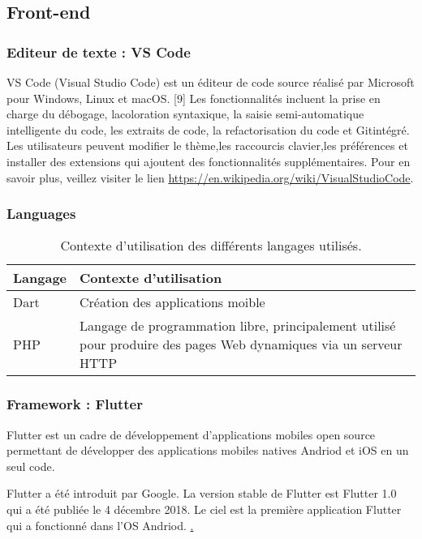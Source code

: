 \documentclass[a4paper, 12pt]{report}
\begin{document}
\subsection{Front-end}
\subsubsection{Editeur de texte : VS Code}
VS Code (Visual Studio Code) est un éditeur de code source réalisé par Microsoft pour Windows, Linux et macOS. [9] Les fonctionnalités incluent la prise en charge du débogage, lacoloration syntaxique, la saisie semi-automatique intelligente du code, les extraits de code, la refactorisation du code et Gitintégré. Les utilisateurs peuvent modifier le thème,les raccourcis clavier,les préférences et installer des extensions qui ajoutent des fonctionnalités supplémentaires. Pour en savoir plus, veillez visiter le lien \href{https://en.wikipedia.org/wiki/Visual_Studio_Code}{https://en.wikipedia.org/wiki/VisualStudioCode}.
\subsubsection{Languages}
\begin{table}[h]
	\begin{tabular}{|m{6cm}|m{10cm}|}
		\hline
		\textbf{Langage} & \textbf{Contexte d’utilisation} \\
		\hline
		Dart & Création des applications moible\\
		\hline
		PHP  & Langage de programmation libre, principalement utilisé pour produire des pages Web dynamiques via un serveur HTTP\\
		\hline
		
	\end{tabular}
	\caption{Contexte d’utilisation des différents langages utilisés.}
\end{table}
\subsubsection{Framework : Flutter}
\label{Flutter}
Flutter est un cadre de développement d’applications mobiles open source permettant de développer des applications mobiles natives Andriod et iOS en un seul code.

Flutter a été introduit par Google. La version stable de Flutter est Flutter 1.0 qui a été publiée le 4 décembre 2018. Le ciel est la première application Flutter qui a fonctionné dans l’OS Andriod. \href{https://www.claudebueno.com/technologies/introduction-a-flutter.htm}.
\end{document}
